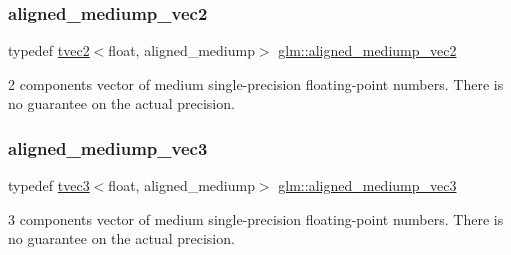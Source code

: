 \subsubsection{\texorpdfstring{aligned\+\_\+mediump\+\_\+vec2}{aligned\_mediump\_vec2}}
{\footnotesize\ttfamily typedef \hyperlink{structglm_1_1tvec2}{tvec2}$<$float, aligned\+\_\+mediump$>$ \hyperlink{group__gtc__type__aligned_ga4bbaec6ecf4e72dfdb2ad83b3b8c49b8}{glm\+::aligned\+\_\+mediump\+\_\+vec2}}

2 components vector of medium single-\/precision floating-\/point numbers. There is no guarantee on the actual precision. \mbox{\label{group__gtc__type__aligned_ga26e1bf19f9506f2b36949687d927fe63}} 
\subsubsection{\texorpdfstring{aligned\+\_\+mediump\+\_\+vec3}{aligned\_mediump\_vec3}}
{\footnotesize\ttfamily typedef \hyperlink{structglm_1_1tvec3}{tvec3}$<$float, aligned\+\_\+mediump$>$ \hyperlink{group__gtc__type__aligned_ga26e1bf19f9506f2b36949687d927fe63}{glm\+::aligned\+\_\+mediump\+\_\+vec3}}

3 components vector of medium single-\/precision floating-\/point numbers. There is no guarantee on the actual precision. 